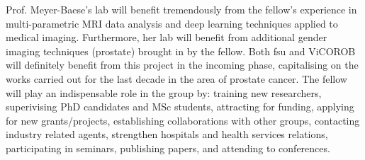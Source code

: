 Prof. Meyer-Baese's lab will benefit tremendously from the fellow's experience in multi-parametric MRI data analysis and deep learning techniques applied to medical imaging.
Furthermore, her lab will benefit from additional gender imaging techniques (prostate) brought in by the fellow.
Both \ac{fsu} and ViCOROB  will definitely benefit from this project in the incoming phase, capitalising on the works carried out for the last decade in the area of prostate cancer.
The fellow will play an indispensable role in the group by: training new researchers, superivising PhD candidates and MSc students, attracting for funding, applying for new grants/projects,  establishing collaborations with other groups, contacting industry related agents, strengthen hospitals and health services relations, participating in seminars, publishing papers, and attending to conferences.


